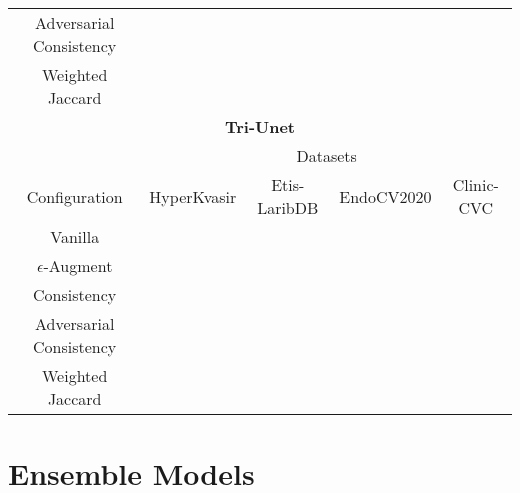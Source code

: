 \begin{center}
\begin{tabular}{|c|c|c|c|c|}
        Adversarial Consistency&&&& \\
        Weighted Jaccard&&&&\\
        \hline
        \multicolumn{5}{|c|}{\textbf{Tri-Unet}}\\
        \hline
        &\multicolumn{4}{|c|}{Datasets}\\
        \cline{2-5}
        Configuration&HyperKvasir&Etis-LaribDB&EndoCV2020 & Clinic-CVC \\
        \hline
        Vanilla&  &  & &\\
        \(\epsilon\)-Augment& & & & \\
        Consistency & & && \\
        Adversarial Consistency&&&& \\
        Weighted Jaccard&&&&\\
        \hline
        \end{tabular}
    \end{center}
    \section{Ensemble Models}
    
